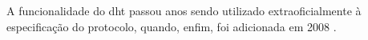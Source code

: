 \begin{figure}[H]
    \centering
\end{figure}

A funcionalidade do \gls*{dht} passou anos sendo utilizado extraoficialmente à
especificação do protocolo, quando, enfim, foi adicionada em 2008
\cite{site:bittorrent-dht}.




